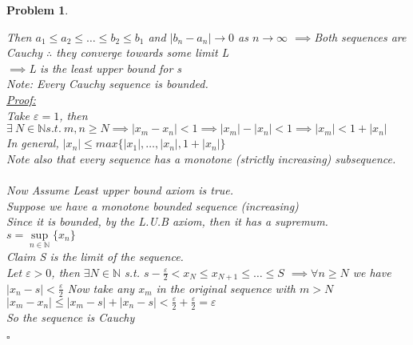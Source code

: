 \documentclass[a4paper]{article}
\newtheorem{prob}{\large{\large{Problem}}}
\newenvironment{sol}{\noindent{\large{\bf Solution:}}}{\hfill\ensuremath{\square}}
\def\bN{\mathbb N}
\def\imp{\ensuremath{\implies}}
\def\nl{\newline}
\begin{document}
\begin{prob}
{\begin{enumerate}[(a.)]
\begin{sol}
{\begin{center}
\end{center}
Then $a_1\leq a_2\leq \dots \leq b_2\leq b_1$ and $|b_n-a_n|\to 0$ as $n\to \infty$
\nl\imp Both sequences are Cauchy $\therefore$ they converge towards some limit L\\
\imp L is the least upper bound for s \checkmark\\
Note: Every Cauchy sequence is bounded.\\
\underline{Proof:} \\
Take $\varepsilon=1$, then \\
$\exists \ N\in \bN s.t. \ m,n\geq N \imp |x_m-x_n|<1 \imp |x_m|-|x_n|<1 \imp |x_m|<1+|x_n|$\\
In general, $|x_n|\leq max\{|x_1|,\dots,|x_n|,1+|x_n|\}$\\
Note also that every sequence has a monotone (strictly increasing) subsequence.\\ \\
Now Assume Least upper bound axiom is true.\\
Suppose we have a monotone bounded sequence (increasing)\\
Since it is bounded, by the L.U.B axiom, then it has a supremum.\\ $s=\sup\limits_{n\in \bN}\{x_n\}$\\
Claim S is the limit of the sequence.\\
Let $\varepsilon>0$, then $\exists N\in \bN$ s.t. $s-\frac{\varepsilon}2<x_N\leq x_{N+1}\leq\dots\leq S$
\nl\imp $\forall n\geq N$ we have $|x_n-s|<\frac{\varepsilon}{2}$
\nl Now take any $x_m$ in the original sequence with $m>N$ \\
$|x_m-x_n|\leq |x_m-s|+|x_n-s|<\frac{\varepsilon}{2}+\frac{\varepsilon}{2}=\varepsilon$\\ 
So the sequence is Cauchy \checkmark
}
\end{sol}
\end{enumerate}
}
   
\end{prob}
\pagebreak
\end{document}
